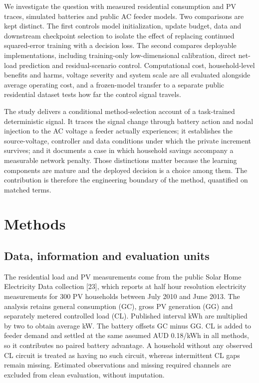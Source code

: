 \documentclass[pdflatex,Numbered,sn-basic]{sn-jnl}
\begin{document}
We investigate the question with measured residential consumption and PV traces, simulated batteries and public AC feeder models. Two comparisons are kept distinct. The first controls model initialization, update budget, data and downstream checkpoint selection to isolate the effect of replacing continued squared-error training with a decision loss. The second compares deployable implementations, including training-only low-dimensional calibration, direct net-load prediction and residual-scenario control. Computational cost, household-level benefits and harms, voltage severity and system scale are all evaluated alongside average operating cost, and a frozen-model transfer to a separate public residential dataset tests how far the control signal travels.

The study delivers a conditional method-selection account of a task-trained deterministic signal. It traces the signal change through battery action and nodal injection to the AC voltage a feeder actually experiences; it establishes the source-voltage, controller and data conditions under which the private increment survives; and it documents a case in which household savings accompany a measurable network penalty. Those distinctions matter because the learning components are mature and the deployed decision is a choice among them. The contribution is therefore the engineering boundary of the method, quantified on matched terms.

\section{Methods}

\subsection{Data, information and evaluation units}

The residential load and PV measurements come from the public Solar Home Electricity Data collection [23], which reports at half hour resolution electricity measurements for 300 PV households between July 2010 and June 2013. The analysis retains general consumption (GC), gross PV generation (GG) and separately metered controlled load (CL). Published interval kWh are multiplied by two to obtain average kW. The battery offsets GC minus GG. CL is added to feeder demand and settled at the same assumed AUD 0.18/kWh in all methods, so it contributes no paired battery advantage. A household without any observed CL circuit is treated as having no such circuit, whereas intermittent CL gaps remain missing. Estimated observations and missing required channels are excluded from clean evaluation, without imputation.
\end{document}
